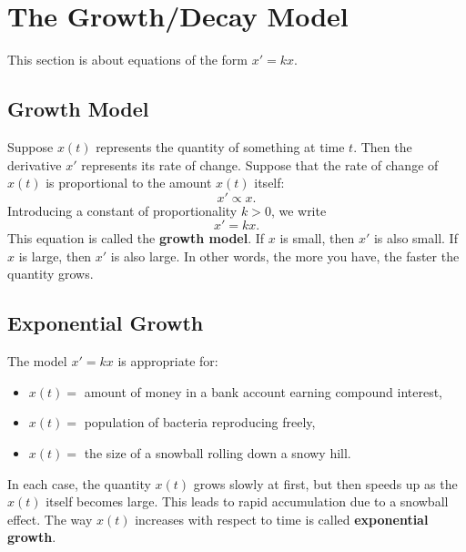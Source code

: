 \documentclass[09pt,letterpaper]{article}
\begin{document}
\section{The Growth/Decay Model}
This section is about equations of the form $x' = kx$. 

\subsection{Growth Model}
Suppose $x(t)$ represents the quantity of something at time $t$. Then the derivative $x'$ represents its rate of change. Suppose that the rate of change of $x(t)$ is proportional to the amount $x(t)$ itself:
\[
x' \propto x.
\]
Introducing a constant of proportionality $k>0$, we write
\[
x' = kx.
\]
This equation is called the \textbf{growth model}.
If $x$ is small, then $x'$ is also small.
If $x$ is large, then $x'$ is also large.
In other words, the more you have, the faster the quantity grows.

\subsection{Exponential Growth}
The model $x'=kx$ is appropriate for:
\begin{itemize}
    \item $x(t)=$ amount of money in a bank account earning compound interest,
    \item $x(t)=$ population of bacteria reproducing freely,
    \item $x(t)=$ the size of a snowball rolling down a snowy hill.
\end{itemize}
In each case, the quantity $x(t)$ grows slowly at first, but then speeds up as the $x(t)$ itself becomes large. This leads to rapid accumulation due to a snowball effect. The way $x(t)$ increases with respect to time is called \textbf{exponential growth}.

\end{document}
